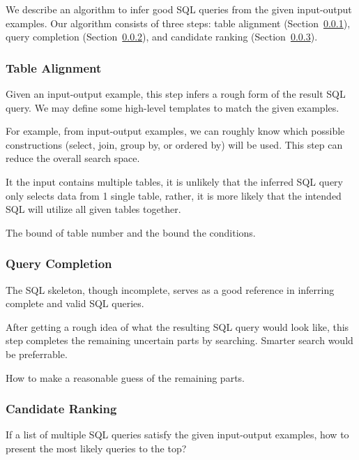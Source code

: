 We describe an algorithm to infer good SQL queries from the given
input-output examples. Our algorithm consists of three steps:
table alignment (Section~\ref{sec:alignment}),
query completion (Section~\ref{sec:completion}), and
candidate ranking (Section~\ref{sec:ranking}).


\subsubsection{Table Alignment}
\label{sec:alignment}

Given an input-output example, this step infers a rough form of the
result SQL query. We may define some high-level templates to match
the given examples.

For example, from input-output examples, we can roughly know which
possible constructions (select, join, group by, or ordered by) will
be used. This step can reduce the overall search space.

It the input contains multiple tables, it is unlikely that the inferred
SQL query only selects data from 1 single table, rather, it is more
likely that the intended SQL will utilize all given tables together.

The bound of table number and the bound the conditions.

\subsubsection{Query Completion}
\label{sec:completion}

The SQL skeleton, though incomplete, serves as a good reference in
inferring complete and valid SQL queries.

After getting a rough idea of what the resulting SQL query would
look like, this step completes the remaining uncertain parts by
searching. Smarter search would be preferrable.

How to make a reasonable guess of the remaining parts.

\subsubsection{Candidate Ranking}
\label{sec:ranking}

If a list of multiple SQL queries satisfy the given input-output examples, how
to present the most likely queries to the top?

